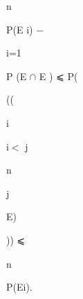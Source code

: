 \documentclass[a4paper,portrait,12pt]{article}
\begin{document}
\begin{flushleft}
n
\end{flushleft}





\begin{flushleft}
P(E i) $-$
\end{flushleft}


\begin{flushleft}
i=1
\end{flushleft}





\begin{flushleft}
P (E $\cap$ E ) ⩽ P(
\end{flushleft}


((


\begin{flushleft}
i
\end{flushleft}





\begin{flushleft}
i$<$ j
\end{flushleft}





\begin{flushleft}
n
\end{flushleft}





\begin{flushleft}
j
\end{flushleft}





\begin{flushleft}
E)
\end{flushleft}


)) ⩽





\begin{flushleft}
n
\end{flushleft}





\begin{flushleft}
P(Ei).
\end{flushleft}
\end{document}

